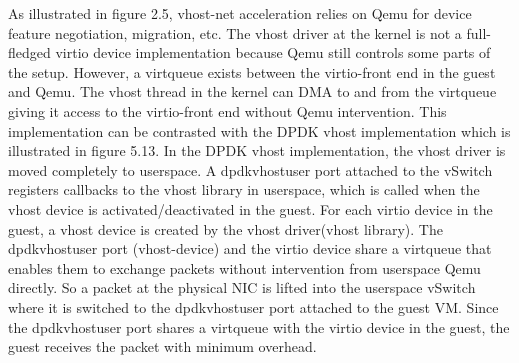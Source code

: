 As illustrated in figure 2.5, vhost-net acceleration relies on Qemu for device feature negotiation, migration, etc. The vhost driver at the kernel is not a full-fledged virtio device implementation because Qemu still controls some parts of the setup. However, a virtqueue exists between the virtio-front end in the guest and Qemu. The vhost thread in the kernel can DMA to and from the virtqueue giving it access to the virtio-front end without Qemu intervention. This implementation can be contrasted with the DPDK vhost implementation which is illustrated in figure 5.13. In the DPDK vhost implementation, the vhost driver is moved completely to userspace. A dpdkvhostuser port attached to the vSwitch registers callbacks to the vhost library in userspace, which is called when the vhost device is activated/deactivated in the guest. For each virtio device in the guest, a vhost device is created by the vhost driver(vhost library). The dpdkvhostuser port (vhost-device) and the virtio device share a virtqueue that enables them to exchange packets without intervention from userspace Qemu directly. So a packet at the physical NIC is lifted into the userspace vSwitch where it is switched to the dpdkvhostuser port attached to the guest VM. Since the dpdkvhostuser port shares a virtqueue with the virtio device in the guest, the guest receives the packet with minimum overhead.
